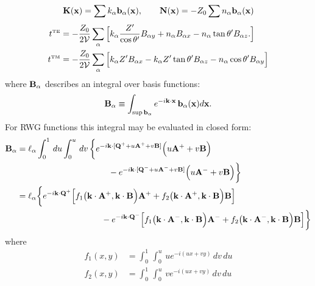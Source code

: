 \documentclass[letterpaper]{article}
\begin{document}
$$ \mathbf{K}(\mathbf{x})=\sum k_\alpha \mathbf{b}_\alpha(\mathbf{x}), \qquad 
   \mathbf{N}(\mathbf{x})=-Z_0 \sum n_\alpha \mathbf{b}_\alpha(\mathbf{x})
$$
\begin{align*}
 t^{\hbox{\tiny{TE}}}
&=-\frac{Z_0}{2\mathcal{V}} \sum_{\alpha}
   \Big[ k_\alpha \frac{Z^\prime}{\cos\theta^\prime} B_{\alpha y}
        +n_\alpha B_{\alpha x} - n_\alpha \tan\theta^\prime B_{\alpha z}.
   \Big]
\\
 t^{\hbox{\tiny{TM}}}
&=-\frac{Z_0}{2\mathcal{V}} \sum_{\alpha}
   \Big[ k_\alpha Z^\prime B_{\alpha x}
        -k_\alpha Z^\prime \tan\theta^\prime B_{\alpha z}
        -n_\alpha \cos\theta^\prime B_{\alpha y}
   \Big]
\end{align*}
where $\mathbf{B}_\alpha$ describes an integral over basis functions:
$$ \mathbf{B}_\alpha
   \equiv 
   \int_{\sup \mathbf{b}_\alpha}
   e^{-i\mathbf{k} \cdot \mathbf{x}} \, \mathbf{b}_\alpha(\mathbf{x})d\mathbf{x}.
$$
For RWG functions this integral may be evaluated in closed form:
\begin{align*}
 \mathbf{B}_\alpha
&=\ell_\alpha
  \int_0^1 \, du \int_0^u \, dv \,
  \bigg\{
  e^{-i\mathbf{k}\cdot [\mathbf{Q}^+ + u \mathbf{A}^+ + v\mathbf{B}]}
  \Big(u\mathbf{A}^+ + v\mathbf{B}\Big)
\\ 
  &\hspace{1.5in}
  - 
  e^{-i\mathbf{k}\cdot [\mathbf{Q}^- + u \mathbf{A}^- + v\mathbf{B}]}
  \Big(u\mathbf{A}^- + v\mathbf{B}\Big)
  \bigg\}
\\
&=\ell_\alpha\bigg\{ 
  e^{-i\mathbf{k} \cdot \mathbf{Q}^+} 
  \Big[ f_1\big(\mathbf{k}\cdot \mathbf{A}^+, \mathbf{k}\cdot \mathbf{B}\Big) \mathbf{A}^+
       +f_2\big(\mathbf{k}\cdot \mathbf{A}^+, \mathbf{k}\cdot \mathbf{B}\Big) \mathbf{B}
  \Big]
\\
&\qquad \qquad\qquad\qquad\qquad
  -
  e^{-i\mathbf{k} \cdot \mathbf{Q}^-} 
  \Big[ f_1\big(\mathbf{k}\cdot \mathbf{A}^-, \mathbf{k}\cdot \mathbf{B}\Big) \mathbf{A}^-
       +f_2\big(\mathbf{k}\cdot \mathbf{A}^-, \mathbf{k}\cdot \mathbf{B}\Big) \mathbf{B}
  \Big]\bigg\}
\\
\end{align*}
where
\begin{align*}
 f_1(x, y)&=\int_0^1 \, \int_0^u \, u e^{-i (ux + vy)} \,dv\,du  
\\
 f_2(x, y)&=\int_0^1 \, \int_0^u \, v e^{-i (ux + vy)} \,dv\,du  
\end{align*}

\newpage
\end{document}
